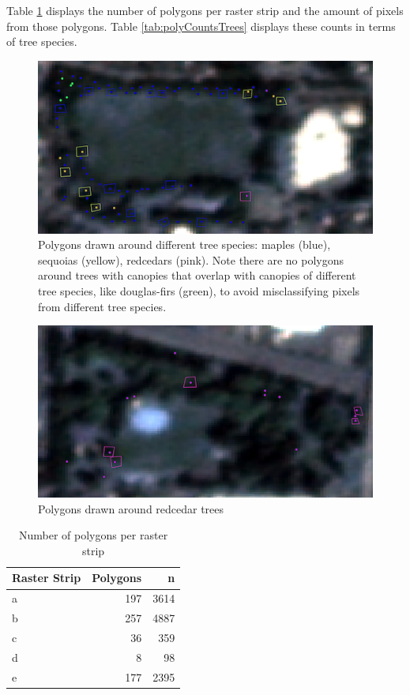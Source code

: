 \documentclass[12pt,twoside]{reedthesis}
\begin{document}
Table \ref{tab:polyCounts} displays the number of polygons per raster strip and the amount of pixels from those polygons. Table \ref{tab:polyCountsTrees} displays these counts in terms of tree species.
\begin{figure}

{\centering \includegraphics[width=0.5\linewidth]{figure/polyimage} 

}

\caption{Polygons drawn around different tree species: maples (blue), sequoias (yellow), redcedars (pink). Note there are no polygons around trees with canopies that overlap with canopies of different tree species, like douglas-firs (green), to avoid misclassifying pixels from different tree species.}\label{fig:polyimage}
\end{figure}
\begin{figure}

{\centering \includegraphics[width=0.5\linewidth]{figure/redcedar} 

}

\caption{Polygons drawn around redcedar trees}\label{fig:redcedar}
\end{figure}
\begin{table}

\caption{\label{tab:polyCounts}Number of polygons per raster strip}
\centering
\begin{tabular}[t]{l|r|r}
\hline
Raster Strip & Polygons & n\\
\hline
a & 197 & 3614\\
\hline
b & 257 & 4887\\
\hline
c & 36 & 359\\
\hline
d & 8 & 98\\
\hline
e & 177 & 2395\\
\hline
\end{tabular}
\end{table}
\end{document}
